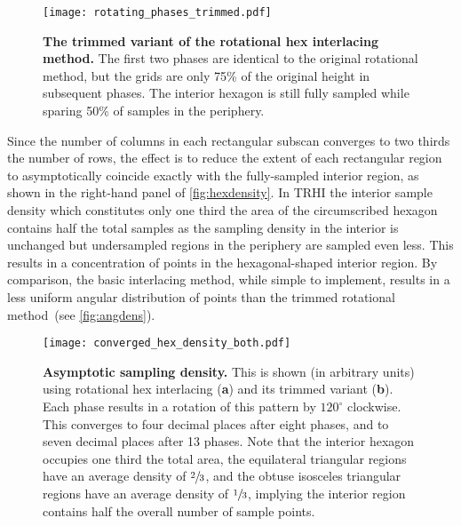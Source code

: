\documentclass[aip, amsmath, amssymb, nobibnotes, nofootinbib, citeautoscript, reprint, superscriptaddress]{revtex4-2}
\begin{document}
    \begin{figure*}
        \texttt{[image: rotating\_phases\_trimmed.pdf]}
        \caption{
            \label{fig:trimmedrotatingphases} 
            \textbf{The trimmed variant of the rotational hex interlacing method.}
            The first two phases are identical to the original rotational method, but the grids are only 75\% of the original height in subsequent phases.
            The interior hexagon is still fully sampled while sparing 50\% of samples in the periphery.
            }
    \end{figure*}


    Since the number of columns in each rectangular subscan converges to two thirds the number of rows, the effect is to reduce the extent of each rectangular region to asymptotically coincide exactly with the fully-sampled interior region, as shown in the right-hand panel of \autoref{fig:hexdensity}.
    In TRHI the interior sample density which constitutes only one third the area of the circumscribed hexagon contains half the total samples as the sampling density in the interior is unchanged but undersampled regions in the periphery are sampled even less.
    This results in a concentration of points in the hexagonal-shaped interior region.
    By comparison, the basic interlacing method, while simple to implement, results in a less uniform angular distribution of points than the trimmed rotational method~(see \autoref{fig:angdens}).

    \begin{figure*}
        \texttt{[image: converged\_hex\_density\_both.pdf]}
        \caption{
            \label{fig:hexdensity}
            \textbf{Asymptotic sampling density.} 
            This is shown (in arbitrary units) using rotational hex interlacing (\textbf{a}) and its trimmed variant (\textbf{b}).
            Each phase results in a rotation of this pattern by $120^{\circ}$ clockwise.
            This converges to four decimal places after eight phases, and to seven decimal places after 13 phases.
            Note that the interior hexagon occupies one third the total area, the equilateral triangular regions have an average density of $\sfrac{2}{3}$, and the obtuse isosceles triangular regions have an average density of $\sfrac{1}{3}$, implying the interior region contains half the overall number of sample points.
            }
    \end{figure*}
\end{document}
